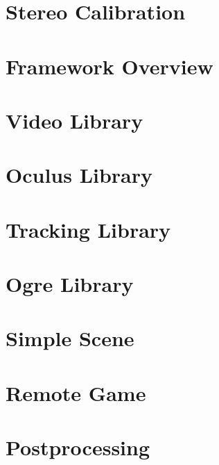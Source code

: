 	\chapter{Stereo Calibration}
	\label{sec:stereo_calibration}
	
	
	\chapter{Framework Overview}
	\label{sec:lib_overview}
	
	
	\chapter{Video Library}
	\label{sec:video_library}
	
	
	\chapter{Oculus Library}
	\label{sec:oculus_library}
	
	
	\chapter{Tracking Library}
	\label{sec:tracking_library}
	
		
	\chapter{Ogre Library}
	\label{sec:ogre_library}
	
	
	\chapter{Simple Scene}
	\label{sec:simple_scene}
	
	
	\chapter{Remote Game}
	\label{sec:remote_game}
	
	
	\chapter{Postprocessing}
	\label{sec:postprocessing}
	
	
	


	



